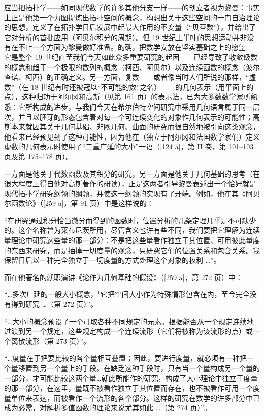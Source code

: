 应当把拓扑学——如同现代数学的许多其他分支一样——的创立者视为黎曼：事实上正是他第一个力图提炼出拓扑空间的概念，构想出关于这些空间的一门自治理论的思想，定义了在拓扑学日后发展中起最大作用的不变量（“贝蒂数”），并给出了它对分析的首批应用（阿贝尔积分的周期）。但 19 世纪上半叶的思想运动并非没有在不止一个方面为黎曼做好准备。的确，把数学安放在坚实基础之上的愿望——它是整个 19 世纪直至我们今天如此众多重要研究的起因——已经导致了收敛级数的概念和趋于一个极限的数列的概念（柯西、阿贝尔）以及连续函数的概念（波尔查诺、柯西）的正确定义。另一方面，复数——或者像当时人们所说的那样，“虚数”（在 18 世纪有时还被冠以“不可能的数”之名）——的几何表示（用平面上的点），这种归功于阿尔冈和高斯（见第 161 页）的表示法，已为大多数数学家所熟悉：它所构成的进步，与我们今天在希尔伯特空间研究中采用几何语言属于同一层次，并且以胚芽的形态包含着对每一个可连续变化的对象作几何表示的可能性；高斯本来就因其关于几何基础、非欧几何、曲面的研究而很自然地被引向这类观念，他看来已经预见到了这种可能性，因为他在（独立于阿尔冈和法国数学家们）定义虚数的几何表示时使用了“二重广延的大小”一语（{[}124 a{]}，第 II 卷，第 101–103 页及第 175–178 页）。

一方面是他关于代数函数及其积分的研究，另一方面是他关于几何基础的思考（在很大程度上得自他对高斯著作的研读），正是这两者引导黎曼表述出一个恰好就是现代拓扑学研究纲领的纲领，并使这一纲领的实现有了开端。例如，他在其《阿贝尔函数论》（{[}259 a{]}，第 91 页）中是这样说的：

“在研究通过积分恰当微分而得到的函数时，位置分析的几条定理几乎是不可缺少的。这个名称曾为莱布尼茨所用，尽管含义也许有些不同，我们要把它理解为连续量理论中研究这些量的那一部分：不是把这些量看作独立于其位置、可用彼此量度的东西来研究，而是抽掉一切度量的观念，只研究它们的位置关系和包含关系。我保留日后以一种完全独立于一切度量的方式处理这个对象的权利 \ldots{}”。

而在他著名的就职演讲《论作为几何基础的假设》（{[}259 a{]}，第 272 页）中：

“\ldots 多次广延的一般大小概念，\(^{1}\)它把空间大小作为特殊情形包含在内，至今完全没有得到研究 \ldots{}（第 272 页）”。

“\ldots 大小的概念预设了一个可取各种不同规定的元素。根据能否从一个规定连续地过渡到另一个规定，这些规定构成一个连续流形（它们将被称为该流形的点）或一个离散流形（第 273 页）”。

“\ldots 度量在于把要比较的各个量相互叠置；因此，要进行度量，就必须有一种把一个量移置到另一个量上的手段。在缺乏这种手段时，只有当一个量构成另一个量的一部分，才可能比较这两个量\ldots{}就此所能作的研究，构成了大小理论中独立于度量的那一部分，在这里，量既不被看作独立于其位置而存在，也不被看作可用一个度量单位来表达，而被看作一个流形的各个部分。这样的研究在数学的许多部分中已成为必需，对解析多值函数的理论来说尤其如此 \ldots{}（第 274 页）”。


